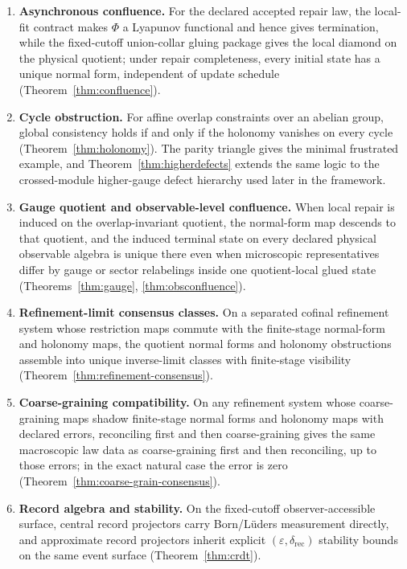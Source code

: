 \documentclass[11pt]{article}
\theoremstyle{remark}
\theoremstyle{plain}
\begin{document}
\begin{enumerate}
\item \textbf{Asynchronous confluence.} For the declared accepted repair law, the local-fit contract makes \(\Phi\) a Lyapunov functional and hence gives termination, while the fixed-cutoff union-collar gluing package gives the local diamond on the physical quotient; under repair completeness, every initial state has a unique normal form, independent of update schedule (Theorem~\ref{thm:confluence}).
\item \textbf{Cycle obstruction.} For affine overlap constraints over an abelian group, global consistency holds if and only if the holonomy vanishes on every cycle (Theorem~\ref{thm:holonomy}). The parity triangle gives the minimal frustrated example, and Theorem~\ref{thm:higherdefects} extends the same logic to the crossed-module higher-gauge defect hierarchy used later in the framework.
\item \textbf{Gauge quotient and observable-level confluence.} When local repair is induced on the overlap-invariant quotient, the normal-form map descends to that quotient, and the induced terminal state on every declared physical observable algebra is unique there even when microscopic representatives differ by gauge or sector relabelings inside one quotient-local glued state (Theorems~\ref{thm:gauge}, \ref{thm:obsconfluence}).
\item \textbf{Refinement-limit consensus classes.} On a separated cofinal refinement system whose restriction maps commute with the finite-stage normal-form and holonomy maps, the quotient normal forms and holonomy obstructions assemble into unique inverse-limit classes with finite-stage visibility (Theorem~\ref{thm:refinement-consensus}).
\item \textbf{Coarse-graining compatibility.} On any refinement system whose coarse-graining maps shadow finite-stage normal forms and holonomy maps with declared errors, reconciling first and then coarse-graining gives the same macroscopic law data as coarse-graining first and then reconciling, up to those errors; in the exact natural case the error is zero (Theorem~\ref{thm:coarse-grain-consensus}).
\item \textbf{Record algebra and stability.} On the fixed-cutoff observer-accessible surface, central record projectors carry Born/L\"uders measurement directly, and approximate record projectors inherit explicit \((\varepsilon,\delta_{\mathrm{rec}})\) stability bounds on the same event surface (Theorem~\ref{thm:crdt}).
\end{enumerate}
\end{document}
